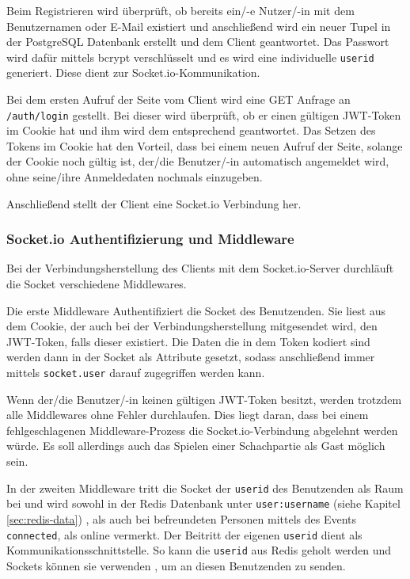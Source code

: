 Beim Registrieren wird überprüft, ob bereits ein/-e Nutzer/-in mit dem Benutzernamen oder E-Mail existiert und anschließend wird ein neuer Tupel in der PostgreSQL Datenbank erstellt und dem Client geantwortet. Das Passwort wird dafür mittels bcrypt verschlüsselt und es wird eine individuelle \verb|userid| generiert. Diese dient zur Socket.io-Kommunikation.

Bei dem ersten Aufruf der Seite vom Client wird eine GET Anfrage an \verb|/auth/login| gestellt. Bei dieser  wird überprüft, ob er einen gültigen JWT-Token im Cookie hat und ihm wird dem entsprechend geantwortet. Das Setzen des Tokens im Cookie hat den Vorteil, dass bei einem neuen Aufruf der Seite, solange der Cookie noch gültig ist, der/die Benutzer/-in automatisch angemeldet wird, ohne seine/ihre Anmeldedaten nochmals einzugeben.

Anschließend stellt der Client eine Socket.io Verbindung her.

\subsubsection{Socket.io Authentifizierung und Middleware}
\label{sec:socketauth}
Bei der Verbindungsherstellung des Clients mit dem Socket.io-Server durchläuft die Socket verschiedene Middlewares.

Die erste Middleware Authentifiziert die Socket des Benutzenden. Sie liest aus dem Cookie, der auch bei der Verbindungsherstellung mitgesendet wird, den JWT-Token, falls dieser existiert. Die Daten die in dem Token kodiert sind werden dann in der Socket als Attribute gesetzt, sodass anschließend immer mittels \verb|socket.user| darauf zugegriffen werden kann.

Wenn der/die Benutzer/-in keinen gültigen JWT-Token besitzt, werden trotzdem alle Middlewares ohne Fehler durchlaufen. Dies liegt daran, dass bei einem fehlgeschlagenen Middleware-Prozess die Socket.io-Verbindung abgelehnt werden würde. Es soll allerdings auch das Spielen einer Schachpartie als Gast möglich sein.

In der zweiten Middleware tritt die Socket der \verb|userid| des Benutzenden als Raum bei und wird sowohl in der Redis Datenbank unter \verb|user:username| (siehe Kapitel \ref{sec:redis-data}) , als auch bei befreundeten Personen mittels des Events \verb|connected|, als online vermerkt.
Der Beitritt der eigenen \verb|userid| dient als Kommunikationsschnittstelle. So kann die \verb|userid| aus Redis geholt werden und Sockets können sie verwenden , um an diesen Benutzenden zu senden.

